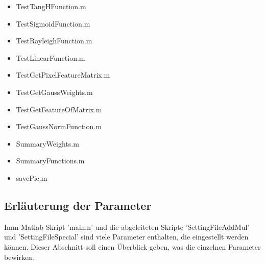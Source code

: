 \begin{description}
	\begin{itemize}
		\item TestTangHFunction.m
		\item TestSigmoidFunction.m
		\item TestRayleighFunction.m
		\item TestLinearFunction.m
		\item TestGetPixelFeatureMatrix.m
		\item TestGetGaussWeights.m
		\item TestGetFeatureOfMatrix.m
		\item TestGaussNormFunction.m
		\item SummaryWeights.m
		\item SummaryFunctions.m
		\item savePic.m
	\end{itemize}
	
\end{description}

\newpage
\subsection{Erläuterung der Parameter}
Imm Matlab-Skript 'main.n' und die abgeleiteten Skripte 'SettingFileAddMul' und 'SettingFileSpecial' sind viele Parameter enthalten, die eingestellt werden können. Dieser Abschnitt soll einen Überblick geben, was die einzelnen Parameter bewirken.

